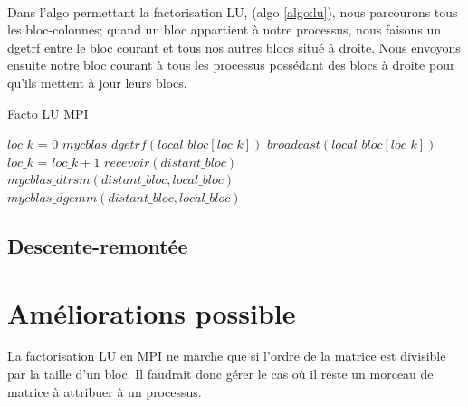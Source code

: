 \documentclass{article}
\begin{document}
\paragraph{}
Dans l'algo permettant la factorisation LU, (algo \ref{algo:lu}), nous parcourons tous les bloc-colonnes; quand un bloc appartient à notre processus, nous faisons un dgetrf entre le bloc courant et tous nos autres blocs situé à droite. Nous envoyons ensuite notre bloc courant à tous les processus possédant des blocs à droite pour qu'ils mettent à jour leurs blocs. 

\begin{algorithm}
  \caption{Facto LU MPI}\label{algo:lu}
  \begin{algorithmic}[1]
    \State $ loc\_k $ = $ 0 $
    \State $ mycblas\_dgetrf(local\_bloc[loc\_k]) $
    \State $ broadcast(local\_bloc[loc\_k]) $
    \State $ loc\_k $ = $ loc\_k + 1 $
    \Else
    \State $ recevoir(distant\_bloc) $
    \State $ mycblas\_dtrsm(distant\_bloc, local\_bloc) $
    \State $ mycblas\_dgemm(distant\_bloc, local\_bloc) $
    \EndIf
    \EndFor

  \end{algorithmic}
\end{algorithm}


\subsection{Descente-remontée}

\section{Améliorations possible}
La factorisation LU en MPI ne marche que si l'ordre de la matrice est divisible par la taille d'un bloc. Il faudrait donc gérer le cas où il reste un morceau de matrice à attribuer à un processus.
\end{document}
